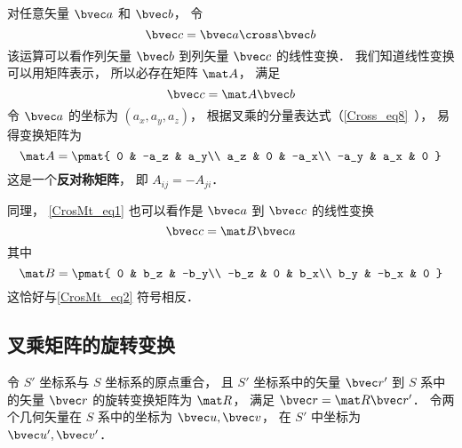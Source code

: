 
对任意矢量 $\bvec a$ 和 $\bvec b$， 令
\begin{equation}\label{CrosMt_eq1}
\bvec c = \bvec a \cross \bvec b
\end{equation}
该运算可以看作列矢量 $\bvec b$ 到列矢量 $\bvec c$ 的线性变换． 我们知道线性变换可以用矩阵表示， 所以必存在矩阵 $\mat A$， 满足
\begin{equation}\label{CrosMt_eq3}
\bvec c = \mat A \bvec b
\end{equation}
令 $\bvec a$ 的坐标为 $(a_x, a_y, a_z)$， 根据叉乘的分量表达式（\autoref{Cross_eq8}~）， 易得变换矩阵为
\begin{equation}\label{CrosMt_eq2}
\mat A = \pmat{
0 & -a_z & a_y\\
a_z & 0 & -a_x\\
-a_y & a_x & 0
}
\end{equation}
这是一个\textbf{反对称矩阵}， 即 $A_{ij} = -A_{ji}$．

同理， \autoref{CrosMt_eq1} 也可以看作是 $\bvec a$ 到 $\bvec c$ 的线性变换
\begin{equation}
\bvec c = \mat B \bvec a
\end{equation}
其中
\begin{equation}
\mat B = \pmat{
0 & b_z & -b_y\\
-b_z & 0 & b_x\\
b_y & -b_x & 0
}
\end{equation}
这恰好与\autoref{CrosMt_eq2} 符号相反．

\subsection{叉乘矩阵的旋转变换}
令 $S'$ 坐标系与 $S$ 坐标系的原点重合， 且 $S'$ 坐标系中的矢量 $\bvec r'$ 到 $S$ 系中的矢量 $\bvec r$ 的旋转变换矩阵为 $\mat R$， 满足 $\bvec r = \mat R\bvec r'$． 令两个几何矢量在 $S$ 系中的坐标为 $\bvec u, \bvec v$， 在 $S'$ 中坐标为 $\bvec u', \bvec v'$．
